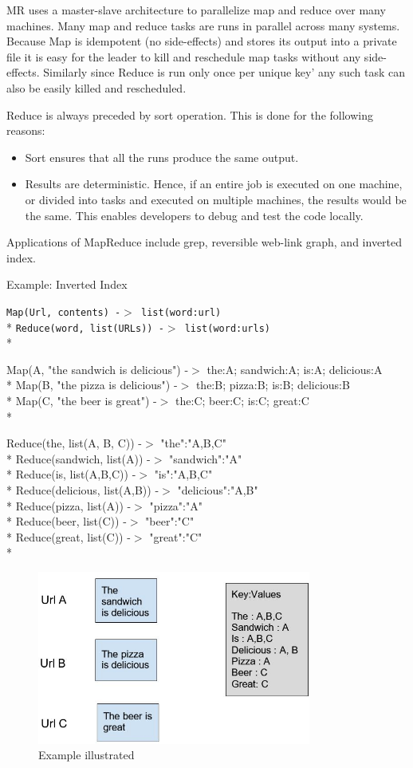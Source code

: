 \documentclass[twoside]{article}
\begin{document}
MR uses a master-slave architecture to parallelize map and reduce over many machines. Many map and reduce tasks are runs in parallel across many systems. Because Map is idempotent (no side-effects) and stores its output into a private file it is easy for the leader to kill and reschedule map tasks without any side-effects. Similarly since Reduce is run only once per unique key’ any such task can also be easily killed and rescheduled.

Reduce is always preceded by sort operation. This is done for the following reasons:
\begin{itemize}
	\item Sort ensures that all the runs produce the same output.
	\item Results are deterministic. Hence, if an entire job is executed on one machine, or divided into tasks and executed on multiple machines, the results would be the same. This enables developers to debug and test the code locally.
\end{itemize}

Applications of MapReduce include grep, reversible web-link graph, and inverted index.

Example:
Inverted Index

{\tt Map(Url, contents) -$>$ list(word:url)}\\*
{\tt Reduce(word, list(URLs)) -$>$ list(word:urls)}\\*

Map(A, "the sandwich is delicious") -$>$ the:A; sandwich:A; is:A; delicious:A\\*
Map(B, "the pizza is delicious") -$>$ the:B; pizza:B; is:B; delicious:B\\*
Map(C, "the beer is great") -$>$ the:C; beer:C; is:C; great:C\\*

Reduce(the, list(A, B, C)) -$>$ "the":"A,B,C"\\*
Reduce(sandwich, list(A)) -$>$ "sandwich":"A"\\*
Reduce(is, list(A,B,C)) -$>$ "is":"A,B,C"\\*
Reduce(delicious, list(A,B)) -$>$ "delicious":"A,B"\\*
Reduce(pizza, list(A)) -$>$ "pizza":"A"\\*
Reduce(beer, list(C)) -$>$ "beer":"C"\\*
Reduce(great, list(C)) -$>$ "great":"C"\\*

\begin{figure}[ht!]
\centering
\includegraphics[width=90mm]{mapreduce_example.jpg}
\caption{Example illustrated \label{overflow}}
\end{figure}
\end{document}
